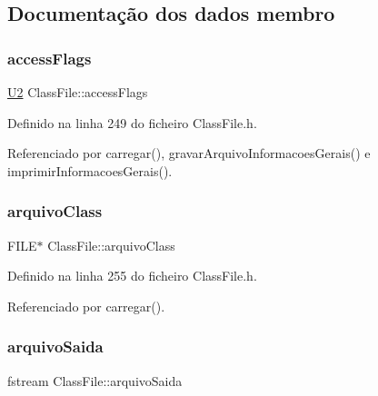 \subsection{Documentação dos dados membro}
\mbox{\label{classClassFile_a16d2ca3e9cdf9267adde08575c57bfa9}} 
\subsubsection{\texorpdfstring{access\+Flags}{accessFlags}}
{\footnotesize\ttfamily \hyperlink{BasicTypes_8h_a90240657108b1b457eef9d3f76e0202e}{U2} Class\+File\+::access\+Flags\hspace{0.3cm}{\ttfamily [private]}}



Definido na linha 249 do ficheiro Class\+File.\+h.



Referenciado por carregar(), gravar\+Arquivo\+Informacoes\+Gerais() e imprimir\+Informacoes\+Gerais().

\mbox{\label{classClassFile_ae2be12dcc1a042970b4d7d7cf9709624}} 
\subsubsection{\texorpdfstring{arquivo\+Class}{arquivoClass}}
{\footnotesize\ttfamily F\+I\+LE$\ast$ Class\+File\+::arquivo\+Class\hspace{0.3cm}{\ttfamily [private]}}



Definido na linha 255 do ficheiro Class\+File.\+h.



Referenciado por carregar().

\mbox{\label{classClassFile_a4aee6c7763d46884d5b2c0297142df99}} 
\subsubsection{\texorpdfstring{arquivo\+Saida}{arquivoSaida}}
{\footnotesize\ttfamily fstream Class\+File\+::arquivo\+Saida\hspace{0.3cm}{\ttfamily [private]}}



